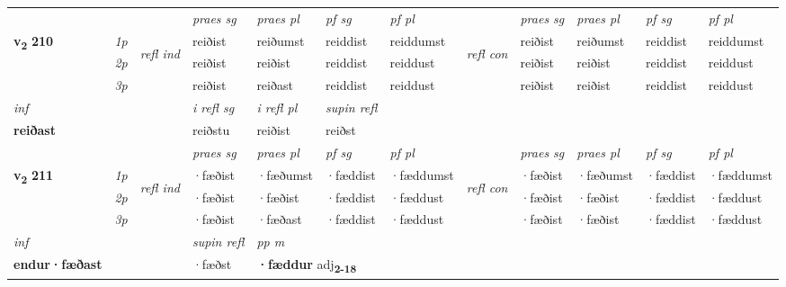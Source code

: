 \begin{longtable}[l]{X>{\footnotesize\itshape}llXXXXlXXXX}
 & &   & \textit{praes sg}  & \textit{praes pl}    & \textit{ pf sg} & \textit{pf pl} & & \textit{praes sg}  & \textit{praes pl}    & \textit{pf sg} & \textit{pf pl }  \\ \cmidrule{4-7} \cmidrule{9-12}
 \multirow{2}{*}{{{\textbf{v{\textsubscript{2}}} \Large{\textbf{210}}}}}  & 1p & \multirow{3}{*}{\begin{turn}{90}\textit{refl ind}\end{turn}}  & reiðist & reiðumst & reiddist & reiddumst & \multirow{3}{*}{\begin{turn}{90}\textit{refl con}\end{turn}}  &reiðist & reiðumst & reiddist & reiddumst \\*
 & 2p &  & reiðist & reiðist & reiddist & reiddust & &reiðist & reiðist & reiddist & reiddust \\*
 & 3p  & & reiðist & reiðast & reiddist & reiddust & & reiðist & reiðist& reiddist & reiddust \\*
\cmidrule{4-7} \cmidrule{9-12}

   {\textit{inf}} & &   & \textit{i refl sg} & \textit{i refl pl}   & \textit{supin refl}  \\*
  {\textbf{reiðast}} & &   & reiðstu & reiðist   & reiðst  \\*

\midrule

 & &   & \textit{praes sg}  & \textit{praes pl}    & \textit{ pf sg} & \textit{pf pl} & & \textit{praes sg}  & \textit{praes pl}    & \textit{pf sg} & \textit{pf pl }  \\ \cmidrule{4-7} \cmidrule{9-12}
 \multirow{2}{*}{{{\textbf{v{\textsubscript{2}}} \Large{\textbf{211}}}}}  & 1p & \multirow{3}{*}{\begin{turn}{90}\textit{refl ind}\end{turn}}  & ·fæðist & ·fæðumst & ·fæddist & ·fæddumst & \multirow{3}{*}{\begin{turn}{90}\textit{refl con}\end{turn}}  &·fæðist & ·fæðumst & ·fæddist & ·fæddumst \\*
 & 2p &  & ·fæðist & ·fæðist & ·fæddist & ·fæddust & &·fæðist & ·fæðist & ·fæddist & ·fæddust \\*
 & 3p  & & ·fæðist & ·fæðast & ·fæddist & ·fæddust & & ·fæðist & ·fæðist& ·fæddist & ·fæddust \\*
\cmidrule{4-7} \cmidrule{9-12}

   {\textit{inf}} & &       & \textit{supin refl} & \textit{pp m} \\*
  {\textbf{endur\allowbreak ·fæðast}} & &       & ·fæðst & \multicolumn{2}{l}{\textbf{·fæddur} adj\textbf{\textsubscript{2-18}}} \\*


\end{longtable}

